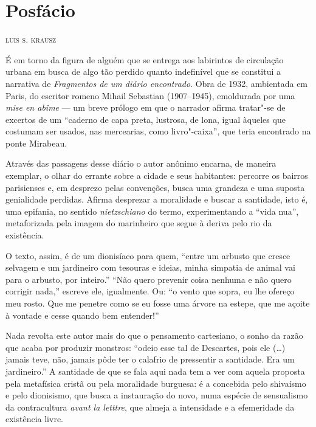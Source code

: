 
\small
\chapter*{Posfácio}

\hfill\textsc{luis s. krausz}

\bigskip

É em torno da figura de alguém que se entrega aos labirintos de
circulação urbana em busca de algo tão perdido quanto indefinível que se
constitui a narrativa de \emph{Fragmentos de um diário encontrado}. Obra
de 1932, ambientada em Paris, do escritor romeno Mihail Sebastian
(1907--1945), emoldurada por uma \emph{mise en abîme} --- um breve prólogo
em que o narrador afirma tratar"-se de excertos de um ``caderno de capa
preta, lustrosa, de lona, igual àqueles que costumam ser usados, nas mercearias, como livro"-caixa'', que teria encontrado na ponte Mirabeau.

Através das passagens desse diário o
autor anônimo encarna, de maneira exemplar, o olhar do errante sobre a
cidade e seus habitantes: percorre os bairros parisienses e, em desprezo
pelas convenções, busca uma grandeza e uma suposta genialidade perdidas.
Afirma desprezar a moralidade e buscar a santidade, isto é,
uma epifania, no sentido \emph{nietzschiano} do termo, experimentando
a ``vida nua'', metaforizada pela imagem do marinheiro que segue à deriva
pelo rio da existência.

O texto, assim, é de um dionisíaco para quem, ``entre um arbusto que
cresce selvagem e um jardineiro com tesouras e ideias, minha simpatia de
animal vai para o arbusto, por inteiro.'' ``Não quero prevenir coisa
nenhuma e não quero corrigir nada,'' escreve ele, igualmente. Ou: ``o
vento que sopra, eu lhe ofereço meu rosto. Que me penetre como se eu
fosse uma árvore na estepe, que me açoite à vontade e cesse quando bem
entender!''

Nada revolta este autor mais do que o pensamento cartesiano, o sonho da
razão que acaba por produzir monstros: ``odeio esse tal de Descartes,
pois ele (\ldots{}) jamais teve, não, jamais pôde ter o calafrio de
pressentir a santidade. Era um jardineiro.'' A santidade de que se fala
aqui nada tem a ver com aquela proposta pela metafísica cristã ou pela
moralidade burguesa: é a concebida pelo shivaísmo e pelo dionisismo, que
busca a instauração do novo, numa espécie de sensualismo da
contracultura \emph{avant la letttre}, que almeja a intensidade e a
efemeridade da existência livre.

